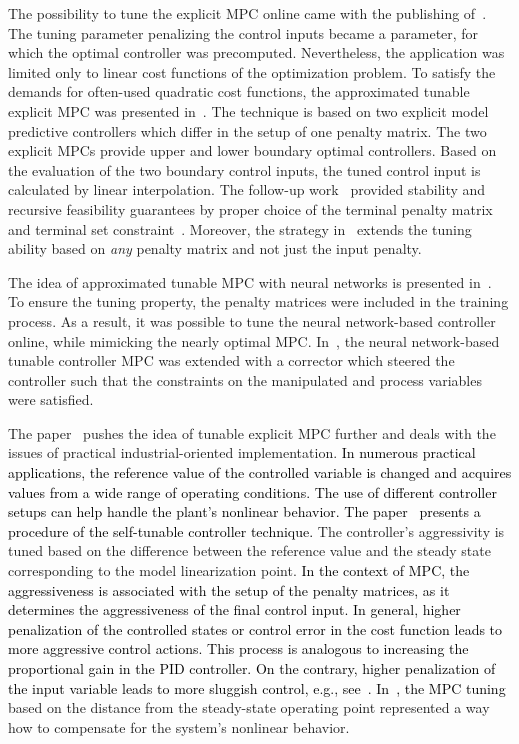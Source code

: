 \documentclass[preprint,12pt]{elsarticle}
\newcommand{\change}[1]{\textcolor{black}{#1}}
\begin{document}
	The possibility to tune the explicit MPC online came with the publishing of~\cite{Baric_tunable}. The tuning parameter penalizing the control inputs became a parameter, for which the optimal controller was precomputed. Nevertheless, the application was limited only to linear cost functions of the optimization problem. To satisfy the demands for often-used quadratic cost functions, the approximated tunable explicit MPC was presented in~\cite{Klauco_tunable}. The technique is based on two explicit model predictive controllers which differ in the setup of one penalty matrix. The two explicit MPCs provide upper and lower boundary optimal controllers. Based on the evaluation of the two boundary control inputs, the tuned control input is calculated by linear interpolation. The follow-up work~\cite{Oravec_tunable} provided stability and recursive feasibility guarantees by proper choice of the terminal penalty matrix and terminal set constraint~\cite{Mayne_stability}. Moreover, the strategy in~\cite{Oravec_tunable} extends the tuning ability based on \textit{any} penalty matrix and not just the input penalty.
	
	The idea of approximated tunable MPC with neural networks is presented in~\cite{Kis_NN_MPC}. To ensure the tuning property, the penalty matrices were included in the training process. As a result, it was possible to tune the neural network-based controller online, while mimicking the nearly optimal MPC. In~\cite{Kis_NN_MPC_corrector}, the neural network-based tunable controller MPC was extended with a corrector which steered the controller such that the constraints on the manipulated and process variables were satisfied. 
	
	The paper~\cite{self_tunable} pushes the idea of tunable explicit MPC further and deals with the issues of practical industrial-oriented implementation. \change{In numerous practical applications, the reference value of the controlled variable is changed and acquires values from a wide range of operating conditions. The use of different controller setups can help handle the plant's nonlinear behavior. The paper~\cite{self_tunable} presents a procedure of the self-tunable controller technique.} The controller's aggressivity is tuned based on the difference between the reference value and the steady state corresponding to the model linearization point. \change{In the context of MPC, the aggressiveness is associated with the setup of the penalty matrices, as it determines the aggressiveness of the final control input. In general, higher penalization of the controlled states or control error in the cost function leads to more aggressive control actions. This process is analogous to increasing the proportional gain in the PID controller. On the contrary, higher penalization of the input variable leads to more sluggish control, e.g., see~\cite{Maciejowski_MPC}. In~\cite{self_tunable}, the MPC tuning} based on the distance from the steady-state operating point represented a way how to compensate for the system's nonlinear behavior.  
	
\end{document}
